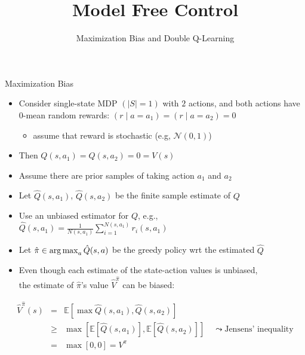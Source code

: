 \documentclass[aspectratio=169]{../latex_main/tntbeamer}  %
\title[RL: Model Free Control]{Model Free Control}
\subtitle{Maximization Bias and Double Q-Learning}
\begin{document}
	
	\maketitle

\begin{frame}[c]{Maximization Bias}
	\vspace{-1.3em}
	\begin{itemize}
		\item Consider single-state MDP $(|S| = 1)$ with $2$ actions, and both actions have 0-mean random rewards: $(r \mid a = a_1 ) = (r \mid a = a_2) = 0$
		\begin{itemize}
				\item assume that reward is stochastic (e.g, $\mathcal{N}(0,1)$)
		\end{itemize}
		\item Then $Q(s,a_1) = Q(s,a_2) = 0 = V(s)$
		\item Assume there are prior samples of taking action $a_1$ and $a_2$
		\pause
		\item Let $\hat{Q}(s,a_1)$, $\hat{Q}(s,a_2)$ be the \alert{finite} sample estimate of $Q$
		\item Use an unbiased estimator for $Q$, e.g., $\hat{Q}(s,a_1) = \frac{1}{N(s,a_1)} \sum_{i=1}^{N(s,a_1)} r_i(s,a_1)$
		\pause
		\item Let $\hat{\pi}\in \operatorname*{arg\,max}_{a}\hat{Q}(s,a)$ be the greedy policy wrt the estimated $\hat{Q}$
		\pause
		\item Even though each estimate of the state-action values is unbiased,\\ the estimate of $\hat{\pi}$'s value $\hat{V}^{\hat{\pi}}$ can be biased:
	\end{itemize}

\vspace{-1em}
\begin{eqnarray}
\hat{V}^{\hat{\pi}}(s) &=& \mathbb{E} [\max \hat{Q}(s,a_1), \hat{Q}(s,a_2)]\nonumber\\
&\geq& \max [\mathbb{E}[\hat{Q}(s,a_1)],\mathbb{E}[\hat{Q}(s,a_2)]] \quad \leadsto \text{Jensens' inequality} \nonumber\\
&=& \max[0,0] = V^\pi\nonumber
\end{eqnarray}
	
\end{frame}
\end{document}
